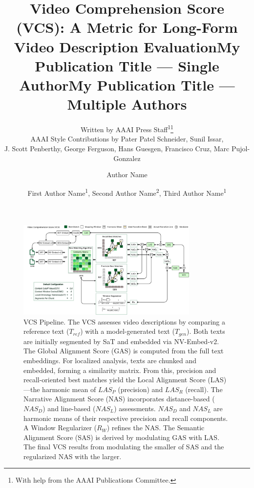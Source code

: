 \documentclass[letterpaper]{article} %
\title{Video Comprehension Score (VCS): A Metric for Long-Form Video Description Evaluation}
\author{
    Written by AAAI Press Staff\textsuperscript{\rm 1}\thanks{With help from the AAAI Publications Committee.}\\
    AAAI Style Contributions by Pater Patel Schneider,
    Sunil Issar,\\
    J. Scott Penberthy,
    George Ferguson,
    Hans Guesgen,
    Francisco Cruz\equalcontrib,
    Marc Pujol-Gonzalez\equalcontrib
}
\title{My Publication Title --- Single Author}
\author {
    Author Name
}
\title{My Publication Title --- Multiple Authors}
\author {
    First Author Name\textsuperscript{\rm 1},
    Second Author Name\textsuperscript{\rm 2},
    Third Author Name\textsuperscript{\rm 1}
}
\begin{document}
\maketitle

\begin{figure}[t]
\centering
\includegraphics[width=0.8\textwidth]{VCS}
\caption{VCS Pipeline. The VCS assesses video descriptions by comparing a reference text ($T_{ref}$) with a model-generated text ($T_{gen}$). Both texts are initially segmented by SaT and embedded via NV-Embed-v2. The Global Alignment Score (GAS) is computed from the full text embeddings. For localized analysis, texts are chunked and embedded, forming a similarity matrix. From this, precision and recall-oriented best matches yield the Local Alignment Score (LAS)—the harmonic mean of $LAS_P$ (precision) and $LAS_R$ (recall). The Narrative Alignment Score (NAS) incorporates distance-based ($NAS_D$) and line-based ($NAS_L$) assessments. $NAS_D$ and $NAS_L$ are harmonic means of their respective precision and recall components. A Window Regularizer ($R_W$) refines the NAS. The Semantic Alignment Score (SAS) is derived by modulating GAS with LAS. The final VCS results from modulating the smaller of SAS and the regularized NAS with the larger.}
\label{fig:vcs-architecture}
\end{figure}
\end{document}
